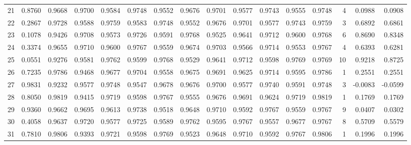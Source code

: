 \begin{tabular}{lrrrrrrrrrrrrrrr}
21  &      0.8760 &  0.9668 &  0.9700 &  0.9584 &  0.9748 &  0.9552 &  0.9676 &  0.9701 &  0.9577 &  0.9743 &   0.9555 &     0.9748 &      4 &                    0.0988 &                     0.0908 \\
22  &      0.2867 &  0.9728 &  0.9588 &  0.9759 &  0.9583 &  0.9748 &  0.9552 &  0.9676 &  0.9701 &  0.9577 &   0.9743 &     0.9759 &      3 &                    0.6892 &                     0.6861 \\
23  &      0.1078 &  0.9426 &  0.9708 &  0.9573 &  0.9726 &  0.9591 &  0.9768 &  0.9525 &  0.9641 &  0.9712 &   0.9600 &     0.9768 &      6 &                    0.8690 &                     0.8348 \\
24  &      0.3374 &  0.9655 &  0.9710 &  0.9600 &  0.9767 &  0.9559 &  0.9674 &  0.9703 &  0.9566 &  0.9714 &   0.9553 &     0.9767 &      4 &                    0.6393 &                     0.6281 \\
25  &      0.0551 &  0.9276 &  0.9581 &  0.9762 &  0.9599 &  0.9768 &  0.9529 &  0.9641 &  0.9712 &  0.9598 &   0.9769 &     0.9769 &     10 &                    0.9218 &                     0.8725 \\
26  &      0.7235 &  0.9786 &  0.9468 &  0.9677 &  0.9704 &  0.9558 &  0.9675 &  0.9691 &  0.9625 &  0.9714 &   0.9595 &     0.9786 &      1 &                    0.2551 &                     0.2551 \\
27  &      0.9831 &  0.9232 &  0.9577 &  0.9748 &  0.9547 &  0.9678 &  0.9676 &  0.9700 &  0.9577 &  0.9740 &   0.9591 &     0.9748 &      3 &                   -0.0083 &                    -0.0599 \\
28  &      0.8050 &  0.9819 &  0.9415 &  0.9719 &  0.9598 &  0.9767 &  0.9555 &  0.9676 &  0.9691 &  0.9624 &   0.9719 &     0.9819 &      1 &                    0.1769 &                     0.1769 \\
29  &      0.9360 &  0.9662 &  0.9695 &  0.9613 &  0.9738 &  0.9518 &  0.9648 &  0.9710 &  0.9592 &  0.9767 &   0.9559 &     0.9767 &      9 &                    0.0407 &                     0.0302 \\
30  &      0.4058 &  0.9637 &  0.9720 &  0.9577 &  0.9725 &  0.9589 &  0.9762 &  0.9595 &  0.9767 &  0.9557 &   0.9677 &     0.9767 &      8 &                    0.5709 &                     0.5579 \\
31  &      0.7810 &  0.9806 &  0.9393 &  0.9721 &  0.9598 &  0.9769 &  0.9523 &  0.9648 &  0.9710 &  0.9592 &   0.9767 &     0.9806 &      1 &                    0.1996 &                     0.1996 \\

\end{tabular}
